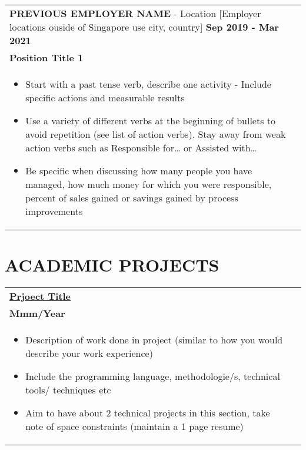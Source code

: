 \documentclass[a4paper,8pt]{article}
\begin{document}
\begin{tabularx}{\linewidth}{ @{}l r@{} }
\textbf{PREVIOUS EMPLOYER NAME} - Location [Employer locations ouside of Singapore use city, country] \hfill \textbf{Sep 2019 - Mar 2021} \\[4pt]
\textbf{Position Title 1} \\[4pt]
\begin{minipage}[t]{\linewidth}
    \begin{itemize}[nosep,after=\strut, leftmargin=1em, itemsep=2pt]
        \item Start with a past tense verb, describe one activity - Include specific actions and measurable results
        \item Use a variety of different verbs at the beginning of bullets to avoid repetition (see list of action verbs).  Stay away from weak action verbs such as Responsible for… or Assisted with…
        \item Be specific when discussing how many people you have managed, how much money for which you were responsible, percent of sales gained or savings gained by process improvements
    \end{itemize}
\end{minipage}
\end{tabularx}



\section{\textbf{ACADEMIC PROJECTS}}
\begin{tabularx}{\linewidth}{ @{}l r@{} }
\textbf{\href{https://github.com/}{Prjoect Title}} \\[4pt]
\textbf{Mmm/Year} \\[4pt]
\begin{minipage}[t]{\linewidth}
    \begin{itemize}[nosep,after=\strut, leftmargin=1em, itemsep=2pt]
        \item Description of work done in project (similar to how you would describe your work experience)
        \item Include the programming language, methodologie/s, technical tools/ techniques etc 
        \item Aim to have about 2 technical projects in this section, take note of space constraints (maintain a 1 page resume)
    \end{itemize}
\end{minipage}
\end{tabularx}
\end{document}
